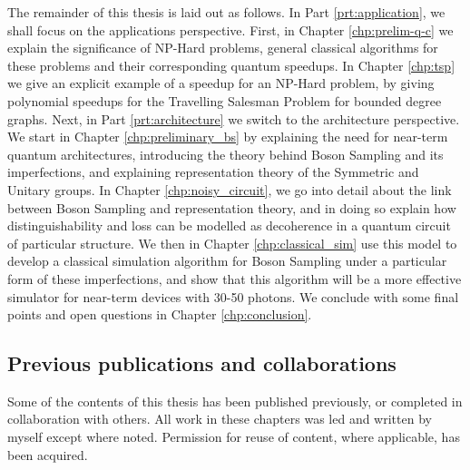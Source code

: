 The remainder of this thesis is laid out as follows. In Part \ref{prt:application}, we shall focus on the applications perspective. First, in Chapter \ref{chp:prelim-q-c} we explain the significance of NP-Hard problems, general classical algorithms for these problems and their corresponding quantum speedups. In Chapter \ref{chp:tsp} we give an explicit example of a speedup for an NP-Hard problem, by giving polynomial speedups for the Travelling Salesman Problem for bounded degree graphs. Next, in Part \ref{prt:architecture} we switch to the architecture perspective. We start in Chapter \ref{chp:preliminary_bs} by explaining the need for near-term quantum architectures, introducing the theory behind Boson Sampling and its imperfections, and explaining representation theory of the Symmetric and Unitary groups. In Chapter \ref{chp:noisy_circuit}, we go into detail about the link between Boson Sampling and representation theory, and in doing so explain how distinguishability and loss can be modelled as decoherence in a quantum circuit of particular structure. We then in Chapter \ref{chp:classical_sim} use this model to develop a classical simulation algorithm for Boson Sampling under a particular form of these imperfections, and show that this algorithm will be a more effective simulator for near-term devices with 30-50 photons. We conclude with some final points and open questions in Chapter \ref{chp:conclusion}.

\subsection{Previous publications and collaborations}

Some of the contents of this thesis has been published previously, or completed in collaboration with others. All work in these chapters was led and written by myself except where noted. Permission for reuse of content, where applicable, has been acquired.


